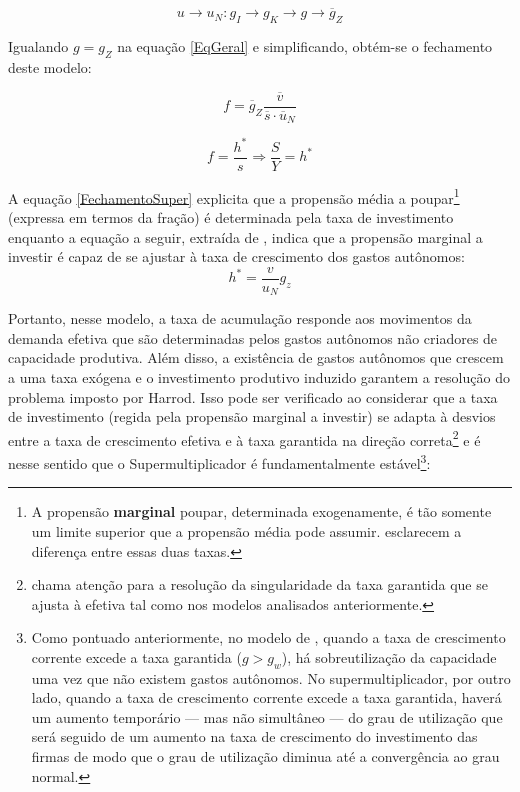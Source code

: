 $$
u \to u_N : g_I \to g_K \to g \to \overline g_Z
$$

Igualando $g = g_Z$ na equação \ref{EqGeral} e simplificando, obtém-se o fechamento deste modelo:

$$
    f = \overline g_Z\frac{\overline v}{\overline s\cdot \overline u_N}
$$

\begin{equation}
    \label{FechamentoSuper}
	f = \frac{h^*}{s} \Rightarrow \frac{S}{Y} = h^*
\end{equation}

A equação \ref{FechamentoSuper} explicita que a propensão média a poupar\footnote{A propensão \textbf{marginal} poupar, determinada exogenamente, é tão somente um limite superior que a propensão média pode assumir. \textcite[p.~51--52]{serrano_o_2000} esclarecem a diferença entre essas duas taxas.} (expressa em termos da fração) é determinada pela taxa de investimento enquanto a equação a seguir, extraída de \textcite{serrano_sraffian_2017}, indica que a propensão marginal a investir é capaz de se ajustar à taxa de crescimento dos gastos autônomos:
$$
h^* = \frac{v}{u_N}g_z
$$

Portanto, nesse modelo, a taxa de acumulação responde aos movimentos da demanda efetiva que são determinadas pelos gastos autônomos não criadores de capacidade produtiva. Além disso, a existência de gastos autônomos que crescem a uma taxa exógena e o investimento produtivo induzido garantem a resolução do problema imposto por Harrod. Isso pode ser verificado ao considerar que a taxa de investimento (regida pela propensão marginal a investir) se adapta à desvios entre a taxa de crescimento efetiva e à taxa garantida na direção correta\footnote{\textcite{cesaratto_neo-kaleckian_2015} chama atenção para a resolução da singularidade da taxa garantida que se ajusta à efetiva tal como nos modelos analisados anteriormente.} e é nesse sentido que o Supermultiplicador é fundamentalmente estável\footnote{
	Como pontuado anteriormente, no modelo de \textcite{harrod_essay_1939}, quando a taxa de crescimento corrente excede a taxa garantida ($g > g_w$), há sobreutilização da capacidade uma vez que não existem gastos autônomos. 
	No supermultiplicador, por outro lado, quando a taxa de crescimento corrente excede a taxa garantida, haverá 
	um aumento temporário --- mas não simultâneo --- do grau de utilização que será seguido de um aumento na taxa de crescimento do investimento das firmas de modo que o grau de utilização diminua até a convergência ao grau normal.}:

